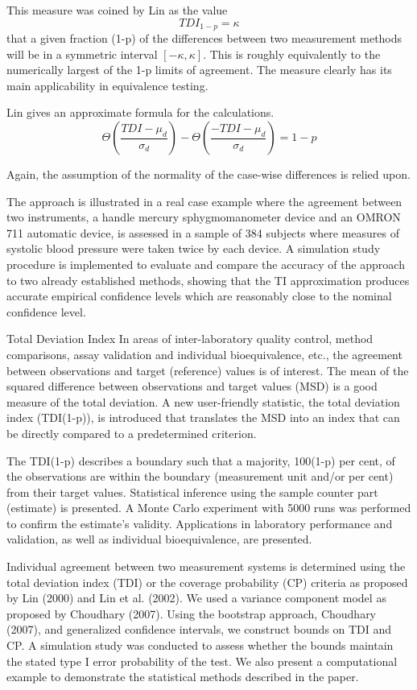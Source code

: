 \documentclass[MAIN.tex]{subfiles}
\begin{document}
	This measure was coined by Lin as the value \[TDI_{1-p} = \kappa\] that a given fraction (1-p) of the differences between two measurement methods will be in a symmetric interval $[-\kappa,\kappa]$.
	This is roughly equivalently to the numerically largest of the 1-p limits of agreement.
	The measure clearly has its main applicability in equivalence testing. 
	
	Lin gives an approximate formula for the calculations.
	\[\Theta \left( \frac{ TDI - \mu_d}{\sigma_d} \right) - \Theta \left(  \frac{ -TDI - \mu_d}{\sigma_d} \right) = 1-p\]
	
	Again, the assumption of the normality of the case-wise differences is relied upon.
	
	The approach is illustrated in a real case example where the agreement between two instruments, a handle mercury sphygmomanometer device and an OMRON 711 automatic device, is assessed in a sample of 384 subjects where measures of systolic blood pressure were taken twice by each device. A simulation study procedure is implemented to evaluate and compare the accuracy of the approach to two already established methods, showing that the TI approximation produces accurate empirical confidence levels which are reasonably close to the nominal confidence level.


Total Deviation Index
In areas of inter-laboratory quality control, method comparisons, assay validation and individual bioequivalence, etc., the agreement between observations and target (reference) values is of interest. The mean of the squared difference between observations and target values (MSD) is a good measure of the total deviation. A new user-friendly statistic, the total deviation index (TDI(1-p)), is introduced that translates the MSD into an index that can be directly compared to a predetermined criterion. 

The TDI(1-p) describes a boundary such that a majority, 100(1-p) per cent, of the observations are within the boundary (measurement unit and/or per cent) from their target values. Statistical inference using the sample counter part (estimate) is presented. A Monte Carlo experiment with 5000 runs was performed to confirm the estimate's validity. Applications in laboratory performance and validation, as well as individual bioequivalence, are presented.


Individual agreement between two measurement systems is determined using the total deviation index (TDI) or the coverage probability (CP) criteria as proposed by Lin (2000) and Lin et al. (2002). We used a variance component model as proposed by Choudhary (2007). Using the bootstrap approach, Choudhary (2007), and generalized confidence intervals, we construct bounds on TDI and CP. A simulation study was conducted to assess whether the bounds maintain the stated type I error probability of the test. We also present a computational example to demonstrate the statistical methods described in the paper.
\end{document}
